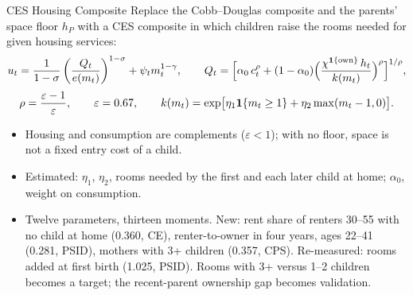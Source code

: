 \begin{frame}[label=ces-appendix]{CES Housing Composite}
\footnotesize
\setlength{\abovedisplayskip}{3pt}\setlength{\belowdisplayskip}{3pt}
Replace the Cobb--Douglas composite and the parents' space floor $h_P$ with a CES composite in which children raise the rooms needed for given housing services:
\[
u_t=\frac{1}{1-\sigma}\left(\frac{Q_t}{e(m_t)}\right)^{1-\sigma}+\psi_t m_t^{1-\gamma},\qquad
Q_t=\Bigl[\alpha_0\,c_t^{\rho}+(1-\alpha_0)\Bigl(\frac{\chi^{\mathbf 1\{\mathrm{own}\}}\,h_t}{k(m_t)}\Bigr)^{\rho}\Bigr]^{1/\rho},
\]
\[
\rho=\frac{\varepsilon-1}{\varepsilon},\qquad \varepsilon=0.67,\qquad
k(m_t)=\exp\bigl[\eta_1\mathbf 1\{m_t\ge1\}+\eta_2\max(m_t-1,0)\bigr].
\]
\begin{itemize}\setlength\itemsep{2pt}
  \item Housing and consumption are complements ($\varepsilon<1$); with no floor, space is not a fixed entry cost of a child.
  \item Estimated: $\eta_1$, $\eta_2$, rooms needed by the first and each later child at home; $\alpha_0$, weight on consumption.
  \item Twelve parameters, thirteen moments. New: rent share of renters 30--55 with no child at home (0.360, CE), renter-to-owner in four years, ages 22--41 (0.281, PSID), mothers with 3+ children (0.357, CPS). Re-measured: rooms added at first birth (1.025, PSID). Rooms with 3+ versus 1--2 children becomes a target; the recent-parent ownership gap becomes validation.
  \end{itemize}
\end{frame}

